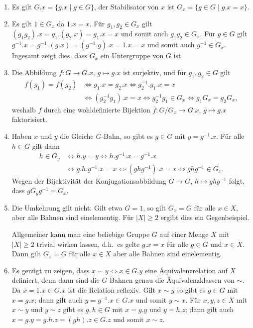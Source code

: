 \begin{solution}
  \begin{enumerate}
    \item
      Es gilt $G.x = \{g.x \mid g \in G\}$, der Stabilisator von $x$ ist $G_x = \{g \in G \mid g.x = x\}$.
    \item
      Es gilt $1 \in G_x$ da $1.x = x$.
      Für $g_1, g_2 \in G_x$ gilt $(g_1 g_2).x = g_1.(g_2.x) = g_1.x = x$ und somit auch $g_1 g_2 \in G_x$.
      Für $g \in G$ gilt $g^{-1}.x = g^{-1}.(g.x) = (g^{-1}.g).x = 1.x = x$ und somit auch $g^{-1} \in G_x$.
      Ingesamt zeigt dies, dass $G_x$ ein Untergruppe von $G$ ist.
    \item
      Die Abbildung $f \colon G \to G.x$, $g \mapsto g.x$ ist surjektiv, und für $g_1, g_2 \in G$ gilt
      \begin{align*}
              f(g_1) = f(g_2)
        &\iff g_1.x = g_2.x
        \iff  g_2^{-1}.g_1.x = x
        \\
        &\iff (g_2^{-1} g_1).x = x
        \iff  g_2^{-1} g_1 \in G_x
        \iff  g_1 G_x = g_2 G_x,
      \end{align*}
      weshalb $f$ durch eine wohldefinierte Bijektion $\overline{f} \colon G/G_x \to G.x$, $\overline{g} \mapsto g.x$ faktorisiert.
    \item
      Haben $x$ und $y$ die Gleiche $G$-Bahn, so gibt es $g \in G$ mit $y = g^{-1}.x$.
      Für alle $h \in G$ gilt dann
      \begin{align*}
              h \in G_y
        &\iff h.y = y
        \iff  h.g^{-1}.x = g^{-1}.x
        \\
        &\iff g.h.g^{-1}.x = x
        \iff  (g h g^{-1}).x = x
        \iff  g h g^{-1} \in G_x.
      \end{align*}
      Wegen der Bijektivität der Konjugationsabbildung $G \to G$, $h \mapsto ghg^{-1}$ folgt, dass $g G_y g^{-1} = G_x$.
    \item
      Die Umkehrung gilt nicht:
      Gilt etwa $G = 1$, so gilt $G_x = G$ für alle $x \in X$, aber alle Bahnen sind einelementig.
      Für $|X| \geq 2$ ergibt dies ein Gegenbeispiel.
      
      Allgemeiner kann man eine beliebige Gruppe $G$ auf einer Menge $X$ mit $|X| \geq 2$ trivial wirken lassen, d.h.\ es gelte $g.x = x$ für alle $g \in G$ und $x \in X$.
      Dann gilt $G_x = G$ für alle $x \in X$ aber alle Bahnen sind einelementig.
    \item
      Es genügt zu zeigen, dass $x \sim y \iff x \in G.y$ eine Äquivalenzrelation auf $X$ definiert, denn dann sind die $G$-Bahnen genau die Äquivalenzklassen von ${\sim}$.
      Da $x = 1.x \in G.x$ ist die Relation reflexiv.
      Gilt $x \sim y$ so gibt es $g \in G$ mit $x = g.x$;
      dann gilt auch $y = g^{-1}.x \in G.x$ und somit $y \sim x$.
      Für $x, y, z \in X$ mit $x \sim y$ und $y \sim z$ gibt es $g, h \in G$ mit $x = g.y$ und $y = h.z$;
      dann gilt auch $x = g.y = g.h.z = (gh).z \in G.z$ und somit $x \sim z$.
  \end{enumerate}
\end{solution}


